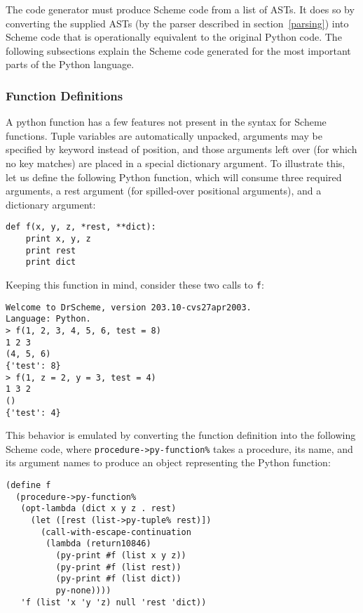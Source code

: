 {The code generator must produce Scheme code from a list of ASTs.  It does so by converting the supplied ASTs (by the parser described in section~\ref{parsing}) into Scheme code that is operationally equivalent to the original Python code.  The following subsections explain the Scheme code generated for the most important parts of the Python language.

\subsubsection{Function Definitions}
\label{functions}

A python function has a few features not present in the syntax for Scheme functions.  Tuple variables are automatically unpacked, arguments may be specified by keyword instead of position, and those arguments left over (for which no key matches) are placed in a special dictionary argument.  To illustrate this, let us define the following Python function, which will consume three required arguments, a rest argument (for spilled-over positional arguments), and a dictionary argument:

\begin{verbatim}
def f(x, y, z, *rest, **dict):
    print x, y, z
    print rest
    print dict
\end{verbatim}

Keeping this function in mind, consider these two calls to \verb|f|:

\begin{verbatim}
Welcome to DrScheme, version 203.10-cvs27apr2003.
Language: Python.
> f(1, 2, 3, 4, 5, 6, test = 8)
1 2 3 
(4, 5, 6) 
{'test': 8} 
> f(1, z = 2, y = 3, test = 4)
1 3 2
() 
{'test': 4} 
\end{verbatim}

This behavior is emulated by converting the function definition into the following Scheme code, where \verb|procedure->py-function%| takes a procedure, its name, and its argument names to produce an object representing the Python function:

\begin{verbatim}
(define f
  (procedure->py-function%
   (opt-lambda (dict x y z . rest)
     (let ([rest (list->py-tuple% rest)])
       (call-with-escape-continuation
        (lambda (return10846)
          (py-print #f (list x y z))
          (py-print #f (list rest))
          (py-print #f (list dict))
          py-none))))
   'f (list 'x 'y 'z) null 'rest 'dict))
\end{verbatim}

}
